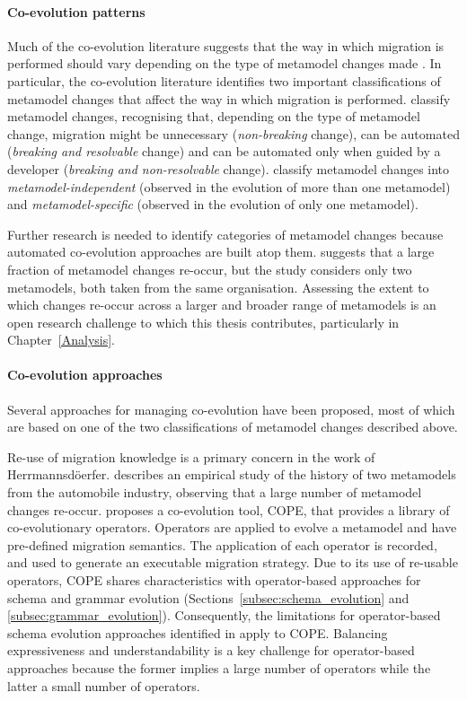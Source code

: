 \paragraph{Co-evolution patterns}
Much of the co-evolution literature suggests that the way in which migration is performed should vary depending on the type of metamodel changes made \cite{gruschko07towards,herrmannsdoerfer09cope,cicchetti08automating,garces09managing}. In particular, the co-evolution literature identifies two important classifications of metamodel changes that affect the way in which migration is performed. \cite{gruschko07towards} classify metamodel changes, recognising that, depending on the type of metamodel change, migration might be unnecessary (\emph{non-breaking} change), can be automated (\emph{breaking and resolvable} change) and can be automated only when guided by a developer (\emph{breaking and non-resolvable} change). \cite{herrmannsdoerfer08automatability} classify metamodel changes into \emph{metamodel-independent} (observed in the evolution of more than one metamodel) and \emph{metamodel-specific} (observed in the evolution of only one metamodel).

Further research is needed to identify categories of metamodel changes because automated co-evolution approaches are built atop them. \cite{herrmannsdoerfer08automatability} suggests that a large fraction of metamodel changes re-occur, but the study considers only two metamodels, both taken from the same organisation. Assessing the extent to which changes re-occur across a larger and broader range of metamodels is an open research challenge to which this thesis contributes, particularly in Chapter~\ref{Analysis}.

\paragraph{Co-evolution approaches}
Several approaches for managing co-evolution have been proposed, most of which are based on one of the two classifications of metamodel changes described above.

Re-use of migration knowledge is a primary concern in the work of Herrmannsd\"{o}erfer. \cite{herrmannsdoerfer08automatability} describes an empirical study of the history of two metamodels from the automobile industry, observing that a large number of metamodel changes re-occur. \cite{herrmannsdoerfer09cope} proposes a co-evolution tool, COPE, that provides a library of co-evolutionary operators. Operators are applied to evolve a metamodel and have pre-defined migration semantics. The application of each operator is recorded, and used to generate an executable migration strategy. Due to its use of re-usable operators, COPE shares characteristics with operator-based approaches for schema and grammar evolution (Sections~\ref{subsec:schema_evolution} and \ref{subsec:grammar_evolution}). Consequently, the limitations for operator-based schema evolution approaches identified in \cite{lerner00model} apply to COPE. Balancing expressiveness and understandability is a key challenge for operator-based approaches because the former implies a large number of operators while the latter a small number of operators.

